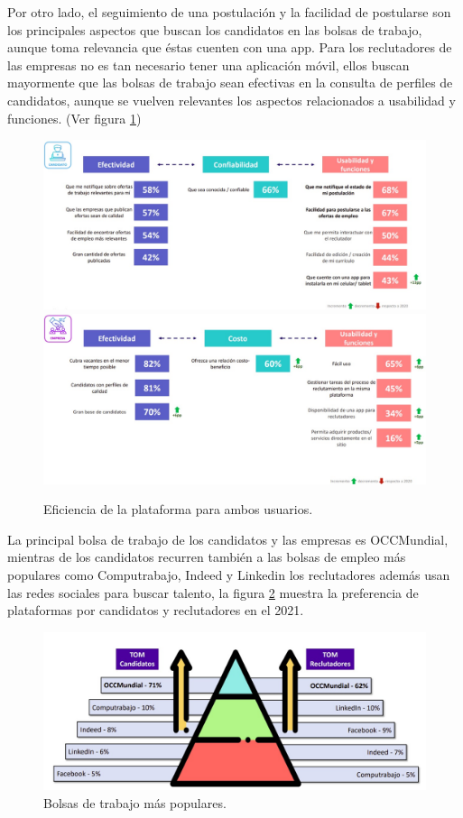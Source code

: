 Por otro lado, el seguimiento de una postulación y la facilidad de postularse son los principales aspectos que buscan los candidatos en las bolsas de trabajo, aunque toma relevancia que éstas cuenten con una app. Para los reclutadores de las empresas no es tan necesario tener una aplicación móvil, ellos buscan mayormente que las bolsas de trabajo sean efectivas en la consulta de perfiles de candidatos, aunque se vuelven relevantes los aspectos relacionados a usabilidad y funciones. \cite{AIMX}\cite{Evo} (Ver figura \ref{mark:efi})
    \begin{figure}[H]
        \begin{center}
            \includegraphics[width=.7\textwidth]{antecedentes/imagenes/prefC.jpeg}
            \includegraphics[width=.7\textwidth]{antecedentes/imagenes/prefE.jpeg}
        \end{center}
        \caption{Eficiencia de la plataforma para ambos usuarios.}
        \label{mark:efi}
    \end{figure}

La principal bolsa de trabajo de los candidatos y las empresas es OCCMundial, mientras de los candidatos recurren también a las 
bolsas de empleo más populares como Computrabajo, Indeed y Linkedin los reclutadores además usan las redes sociales para buscar talento, la
figura \ref{mark:top} muestra la preferencia de plataformas por candidatos y reclutadores en el 2021.\cite{Evo}
\begin{figure}[H]
    \begin{center}
        \includegraphics[width=.8\textwidth]{antecedentes/imagenes/topbdt.jpeg}
    \end{center}
    \caption{Bolsas de trabajo más populares.}
    \label{mark:top}
\end{figure}


